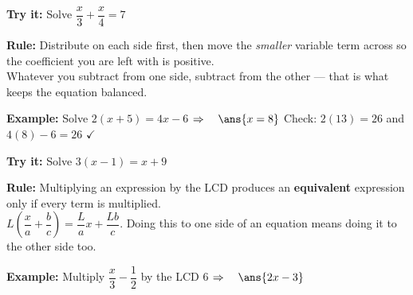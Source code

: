 \documentclass[12pt]{article}
\begin{document}
\begin{tryitbox}
\textbf{Try it:} \quad Solve $\dfrac{x}{3} + \dfrac{x}{4} = 7$\\[2pt]
\end{tryitbox}


\begin{formulabox}
\textbf{Rule:} Distribute on each side first, then move the \emph{smaller} variable term across so
the coefficient you are left with is positive.\\[3pt]
Whatever you subtract from one side, subtract from the other --- that is what keeps the equation
balanced.
\end{formulabox}

\begin{examplebox}
\textbf{Example:} \quad Solve $2(x + 5) = 4x - 6$
$\Rightarrow\quad \ans{x = 8}$ \quad Check: $2(13) = 26$ and $4(8) - 6 = 26$ $\checkmark$
\end{examplebox}

\begin{tryitbox}
\textbf{Try it:} \quad Solve $3(x - 1) = x + 9$\\[2pt]
\end{tryitbox}


\begin{formulabox}
\textbf{Rule:} Multiplying an expression by the LCD produces an \textbf{equivalent} expression
only if every term is multiplied.\\[3pt]
$L\left(\dfrac{x}{a} + \dfrac{b}{c}\right) = \dfrac{L}{a}x + \dfrac{Lb}{c}$. Doing this to one side
of an equation means doing it to the other side too.
\end{formulabox}

\begin{examplebox}
\textbf{Example:} \quad Multiply $\dfrac{x}{3} - \dfrac{1}{2}$ by the LCD $6$
$\Rightarrow\quad \ans{2x - 3}$
\end{examplebox}
\end{document}
